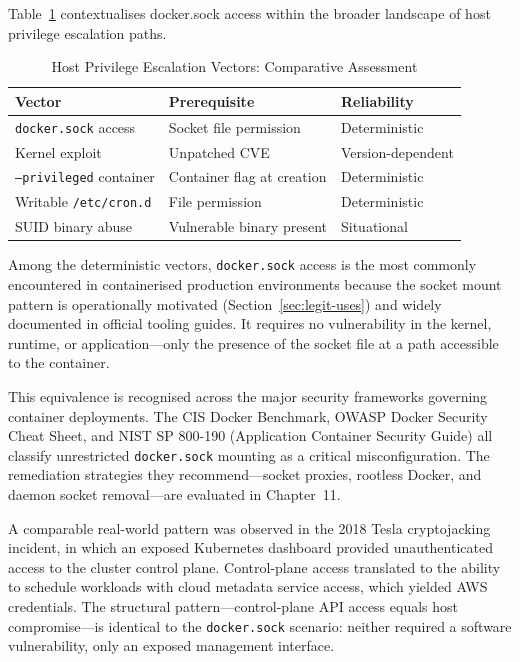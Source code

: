 Table~\ref{tab:escalation-vectors} contextualises docker.sock access within the
broader landscape of host privilege escalation paths.

\begin{table}[h]
\centering
\caption{Host Privilege Escalation Vectors: Comparative Assessment}
\label{tab:escalation-vectors}
\begin{tabular}{|l|l|l|}
\hline
\textbf{Vector}                       & \textbf{Prerequisite}           & \textbf{Reliability}      \\
\hline
\texttt{docker.sock} access           & Socket file permission          & Deterministic             \\
Kernel exploit                        & Unpatched CVE                   & Version-dependent         \\
\texttt{--privileged} container       & Container flag at creation      & Deterministic             \\
Writable \texttt{/etc/cron.d}         & File permission                 & Deterministic             \\
SUID binary abuse                     & Vulnerable binary present       & Situational               \\
\hline
\end{tabular}
\end{table}

Among the deterministic vectors, \texttt{docker.sock} access is the most commonly
encountered in containerised production environments because the socket mount pattern
is operationally motivated (Section~\ref{sec:legit-uses}) and widely documented in
official tooling guides. It requires no vulnerability in the kernel, runtime, or
application---only the presence of the socket file at a path accessible to the
container.

This equivalence is recognised across the major security frameworks governing
container deployments. The CIS Docker Benchmark, OWASP Docker Security Cheat Sheet,
and NIST SP 800-190 (Application Container Security Guide) all classify unrestricted
\texttt{docker.sock} mounting as a critical misconfiguration. The remediation
strategies they recommend---socket proxies, rootless Docker, and daemon socket
removal---are evaluated in Chapter~11.

A comparable real-world pattern was observed in the 2018 Tesla cryptojacking incident,
in which an exposed Kubernetes dashboard provided unauthenticated access to the
cluster control plane. Control-plane access translated to the ability to schedule
workloads with cloud metadata service access, which yielded AWS credentials. The
structural pattern---control-plane API access equals host compromise---is identical to
the \texttt{docker.sock} scenario: neither required a software vulnerability, only an
exposed management interface.